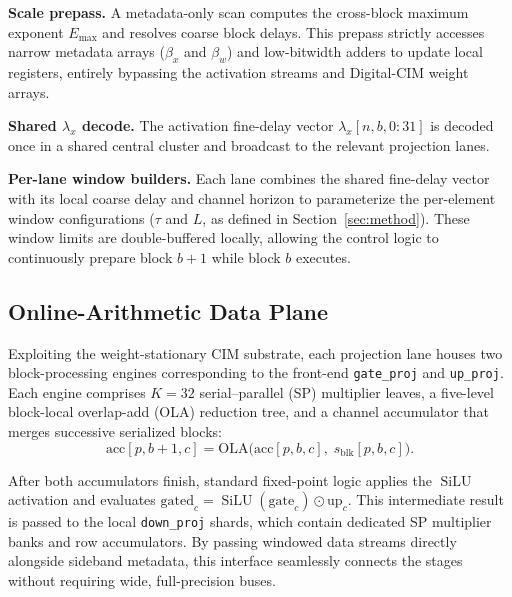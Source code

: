 \documentclass[sigconf]{acmart}
\begin{document}
\textbf{Scale prepass.}
A metadata-only scan computes the cross-block maximum exponent $E_{\max}$ and resolves coarse block delays. This prepass strictly accesses narrow metadata arrays ($\beta_x$ and $\beta_w$) and low-bitwidth adders to update local registers, entirely bypassing the activation streams and Digital-CIM weight arrays.

\textbf{Shared $\lambda_x$ decode.}
The activation fine-delay vector $\lambda_x[n,b,0\!:\!31]$ is decoded once in a shared central cluster and broadcast to the relevant projection lanes.

\textbf{Per-lane window builders.}
Each lane combines the shared fine-delay vector with its local coarse delay and channel horizon to parameterize the per-element window configurations ($\tau$ and $L$, as defined in Section~\ref{sec:method}). These window limits are double-buffered locally, allowing the control logic to continuously prepare block $b\!+\!1$ while block $b$ executes.

\subsection{Online-Arithmetic Data Plane}
\label{sec:dataplane}
Exploiting the weight-stationary CIM substrate, each projection lane houses two block-processing engines corresponding to the front-end \texttt{gate\_proj} and \texttt{up\_proj}. Each engine comprises $K\!=\!32$ serial--parallel (SP) multiplier leaves, a five-level block-local overlap-add (OLA) reduction tree, and a channel accumulator that merges successive serialized blocks:
\begin{equation*}
  \mathrm{acc}[p,b\!+\!1,c]
    = \mathrm{OLA}\!\bigl(\mathrm{acc}[p,b,c],\;
                          s_{\mathrm{blk}}[p,b,c]\bigr).
\end{equation*}

After both accumulators finish, standard fixed-point logic applies the $\operatorname{SiLU}$ activation and evaluates $\text{gated}_c = \operatorname{SiLU}(\text{gate}_c)\odot\text{up}_c$. This intermediate result is passed to the local \texttt{down\_proj} shards, which contain dedicated SP multiplier banks and row accumulators. By passing windowed data streams directly alongside sideband metadata, this interface seamlessly connects the stages without requiring wide, full-precision buses.

\end{document}

